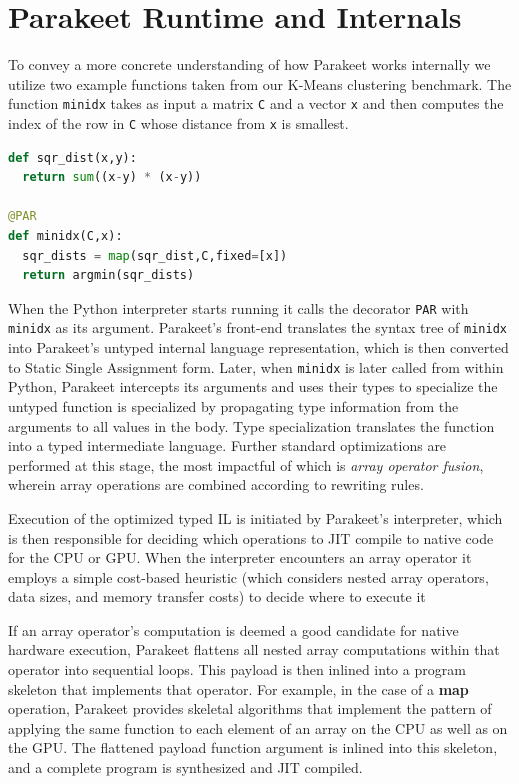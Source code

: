 \documentclass[10pt,twocolumn]{article}
\begin{document}
\section{Parakeet Runtime and Internals}
To convey a more concrete understanding of how Parakeet works internally we utilize two example functions taken from our K-Means clustering benchmark. The function \lstinline{minidx} takes as input a matrix \lstinline{C} and a vector \lstinline{x} and then computes the index of the row in \lstinline{C} whose distance from \lstinline{x} is smallest.

\begin{lstlisting}[language=Python,frame=single, label=MinIdx]
def sqr_dist(x,y):
  return sum((x-y) * (x-y))

@PAR
def minidx(C,x):
  sqr_dists = map(sqr_dist,C,fixed=[x])
  return argmin(sqr_dists)
\end{lstlisting}

When the Python interpreter starts running it calls the decorator \lstinline{PAR} with \lstinline{minidx} as its argument. Parakeet's front-end 
translates the syntax tree of \lstinline{minidx} into Parakeet's untyped internal language representation, which is then converted to Static Single Assignment form. 
Later, when \lstinline{minidx} is later called from within Python, Parakeet intercepts its arguments and uses their types to specialize  the untyped function is specialized by propagating type information from the arguments to all values in the body.  Type specialization translates the function into a typed intermediate language. Further standard optimizations are performed at this stage, the most impactful of which is \emph{array operator fusion}, wherein array operations are combined according to rewriting rules. 

Execution of the optimized typed IL is initiated by Parakeet's interpreter, which is then responsible for deciding which operations to JIT compile to native code for the CPU or GPU. When the interpreter encounters an array operator it employs a simple cost-based heuristic (which considers nested array operators, data sizes, and memory transfer costs) to decide where to execute it 

If an array operator's computation is deemed a good candidate for native hardware execution, Parakeet flattens all nested array computations within that operator into sequential loops.  This payload is then inlined into a program skeleton that implements that operator.  For example, in the case of a \textbf{map} operation, Parakeet provides skeletal algorithms that implement the pattern of applying the same function to each element of an array on the CPU as well as on the GPU.  The flattened payload function argument is inlined into this skeleton, and a complete program is synthesized and JIT compiled.
\end{document}
